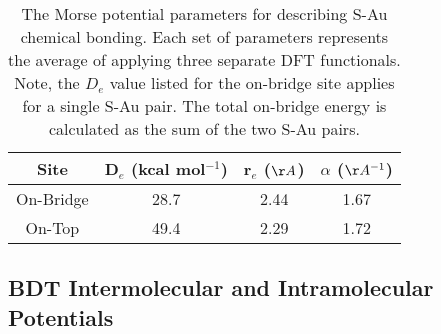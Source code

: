 \documentclass[10pt]{report}  %
\newcommand{\T}{\rule{0pt}{2.6ex}}
\newcommand{\B}{\rule[-1.2ex]{0pt}{0pt}}
\begin{document}
\begin{table} [t]
\caption{The Morse potential parameters for describing S-Au chemical bonding. Each set of parameters represents the average of applying three separate DFT functionals. Note, the $D_{e}$ value listed for the on-bridge site applies for a single S-Au pair. The total on-bridge energy is calculated as the sum of the two S-Au pairs.}
\centering
\begin{tabular}{ c  c  c  c  }
	\hline \hline
Site \T \B & D$_{e}$ (kcal mol$^{-1}$) & r$_{e}$ ($\AA$) & $\alpha$ ($\AA ^{-1}$)\\
	\hline
On-Bridge \T \B & 28.7 & 2.44 & 1.67 \\
On-Top \T \B & 49.4 & 2.29 & 1.72 \\
	\hline
        \hline
\end{tabular}
\label{table:morse}
\end{table}

\subsection{BDT Intermolecular and Intramolecular Potentials}
 
\end{document}
